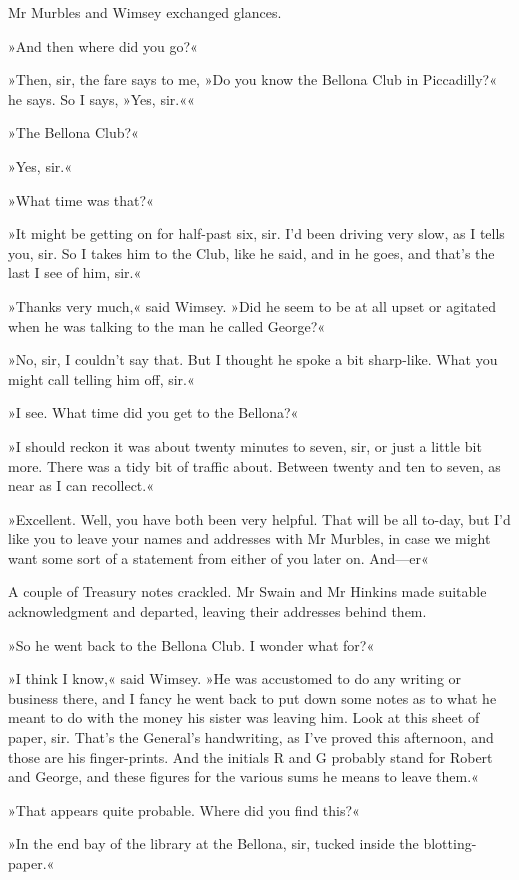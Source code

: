 Mr Murbles and Wimsey exchanged glances.

»And then where did you go?«

»Then, sir, the fare says to me, »Do you know the Bellona Club in Piccadilly?« he says. So I says, »Yes, sir.««

»The Bellona Club?«

»Yes, sir.«

»What time was that?«

»It might be getting on for half-past six, sir. I'd been driving very slow, as I tells you, sir. So I takes him to the Club, like he said, and in he goes, and that's the last I see of him, sir.«

»Thanks very much,« said Wimsey. »Did he seem to be at all upset or agitated when he was talking to the man he called George?«

»No, sir, I couldn't say that. But I thought he spoke a bit sharp-like. What you might call telling him off, sir.«

»I see. What time did you get to the Bellona?«

»I should reckon it was about twenty minutes to seven, sir, or just a little bit more. There was a tidy bit of traffic about. Between twenty and ten to seven, as near as I can recollect.«

»Excellent. Well, you have both been very helpful. That will be all to-day, but I'd like you to leave your names and addresses with Mr Murbles, in case we might want some sort of a statement from either of you later on. And\allowbreak---\allowbreak er\longdash«

A couple of Treasury notes crackled. Mr Swain and Mr Hinkins made suitable acknowledgment and departed, leaving their addresses behind them.

»So he went back to the Bellona Club. I wonder what for?«

»I think I know,« said Wimsey. »He was accustomed to do any writing or business there, and I fancy he went back to put down some notes as to what he meant to do with the money his sister was leaving him. Look at this sheet of paper, sir. That's the General's handwriting, as I've proved this afternoon, and those are his finger-prints. And the initials R and G probably stand for Robert and George, and these figures for the various sums he means to leave them.«

»That appears quite probable. Where did you find this?«

»In the end bay of the library at the Bellona, sir, tucked inside the blotting-paper.«

